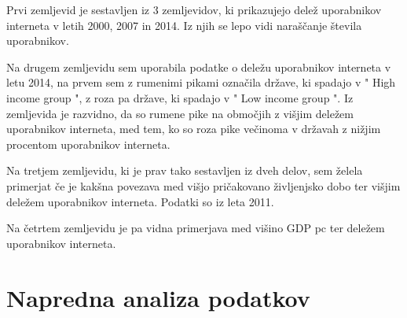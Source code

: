 \documentclass[11pt,a4paper]{article}
\begin{document}
Prvi zemljevid je sestavljen iz 3 zemljevidov, ki prikazujejo delež uporabnikov interneta v letih 2000, 2007 in 2014. Iz njih se lepo vidi naraščanje števila uporabnikov.

\newpage

\begin{figure}[htp] \centering{
}

\end{figure}  


\newpage

Na drugem zemljevidu sem uporabila podatke o deležu uporabnikov interneta v letu 2014, na prvem sem z rumenimi pikami označila države, ki spadajo v " High income group ", z roza pa države, ki spadajo v " Low income group ". Iz zemljevida je razvidno, da so rumene pike na območjih z višjim deležem uporabnikov interneta, med tem, ko so roza pike večinoma v državah z nižjim procentom uporabnikov interneta.


\begin{figure}[h!] 
\begin{center}
 
 \end{center}
\end{figure}

\newpage

Na tretjem zemljevidu, ki je prav tako sestavljen iz dveh delov, sem  želela primerjat če je kakšna povezava med višjo pričakovano življenjsko dobo ter višjim deležem uporabnikov interneta. Podatki so iz leta 2011. \\

\begin{figure}[h!]
\begin{center}
  
  \end{center}
\end{figure}

\newpage
Na četrtem zemljevidu je pa vidna primerjava med višino GDP pc ter deležem uporabnikov interneta.

\begin{figure}[h!]
\begin{center}
  
  \end{center}
\end{figure}

\newpage
\section{Napredna analiza podatkov}
\begin{center}
\begin{figure}
\end{figure}

\end{center}

\begin{center}
\begin{figure}
\end{figure}

\end{center}
\end{document}

